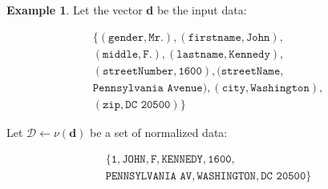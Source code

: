 \documentclass[twoside,twocolumn]{article}
\theoremstyle{definition}
\newtheorem{example}{Example}
\theoremstyle{remark}
\begin{document}
\begin{example}
    Let the vector \textbf{d} be the input data:
    \begin{small} $$\begin{array}{l}
        \{ (\texttt{gender}, \texttt{Mr.}), (\texttt{firstname}, \texttt{John}), \\
        (\texttt{middle}, \texttt{F.}), (\texttt{lastname}, \texttt{Kennedy}), \\
        (\texttt{streetNumber}, \texttt{1600}), (\texttt{streetName}, \\
        \texttt{Pennsylvania Avenue}), (\texttt{city}, \texttt{Washington}), \\
        (\texttt{zip}, \texttt{DC 20500}) \}
    \end{array}$$ \end{small}

    Let $\mathcal{D} \gets \nu(\textbf{d})$  be a set of normalized data:
    \begin{small} $$\begin{array}{l}
        \{ \texttt{1}, \texttt{JOHN}, \texttt{F}, \texttt{KENNEDY}, \texttt{1600}, \\
        \texttt{PENNSYLVANIA AV}, \texttt{WASHINGTON}, \texttt{DC 20500} \} \\
    \end{array}$$ \end{small}


\end{example}
\end{document}
